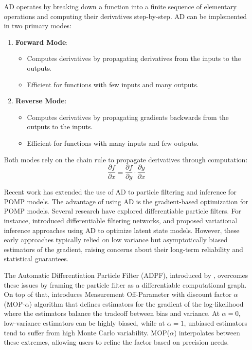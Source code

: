 \documentclass[11pt]{report}
\begin{document}
AD operates by breaking down a function into a finite sequence of elementary operations and computing their derivatives step-by-step. AD can be implemented in two primary modes:
\begin{enumerate}
    \item \textbf{Forward Mode}:
    \begin{itemize}
        \item Computes derivatives by propagating derivatives from the inputs to the outputs.
        \item Efficient for functions with few inputs and many outputs.
    \end{itemize}
    \item \textbf{Reverse Mode}:
    \begin{itemize}
        \item Computes derivatives by propagating gradients backwards from the outputs to the inputs.
        \item Efficient for functions with many inputs and few outputs.
    \end{itemize}
\end{enumerate}
Both modes rely on the chain rule to propagate derivatives through computation:
\[\frac{\partial f}{\partial x} = \frac{\partial f}{\partial y} \cdot \frac{\partial y}{\partial x}\]

Recent work has extended the use of AD to particle filtering and inference for POMP models. The advantage of using AD is the gradient-based optimization for POMP models. Several research have explored differentiable particle filters. For instance, \textbf{\citet{jonschkowski2018differentiable}} introduced differentiable filtering networks, and \textbf{\citet{naesseth2018variational}} proposed variational inference approaches using AD to optimize latent state models. However, these early approaches typically relied on low variance but asymptotically biased estimators of the gradient, raising concerns about their long-term reliability and statistical guarantees.

The Automatic Differentiation Particle Filter (ADPF), introduced by \textbf{\citet{tandifferentiable}}, overcomes these issues by framing the particle filter as a differentiable computational graph. On top of that, \textbf{\citet{tan2024accelerated}} introduces Measurement Off-Parameter with discount factor $\alpha$ (MOP-$\alpha$) algorithm that defines estimators for the gradient of the log-likelihood where the estimators balance the tradeoff between bias and variance. At $\alpha = 0$, low-variance estimators can be highly biased, while at $\alpha = 1$, unbiased estimators tend to suffer from high Monte Carlo variability. MOP($\alpha$) interpolates between these extremes, allowing users to refine the factor based on precision needs.
\end{document}
